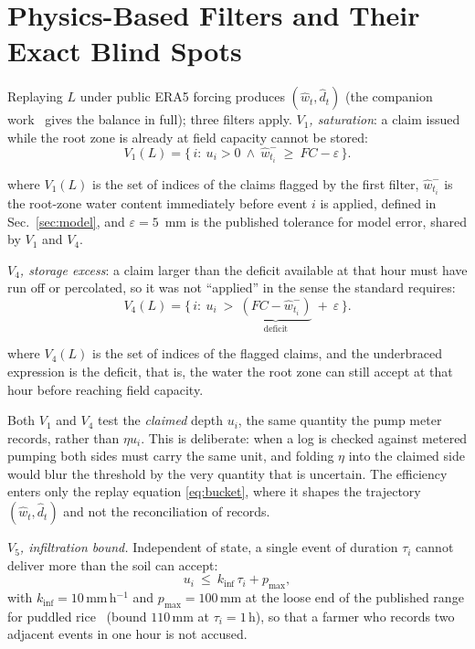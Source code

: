 \section{Physics-Based Filters and Their Exact Blind Spots}
\label{sec:filters}

Replaying $L$ under public ERA5 forcing produces $(\hat w_t,\hat d_t)$ (the
companion work~\cite{twingate2026} gives the balance in full); three filters
apply. \emph{$V_1$, saturation}: a claim issued while the root zone is already
at field capacity cannot be stored:
\begin{equation}
V_1(L)=\{\,i:\ u_i>0\ \wedge\ \hat w_{t_i}^{-}\ \ge\ FC-\varepsilon\,\}.
\label{eq:v1}
\end{equation}

where $V_1(L)$ is the set of indices of the claims flagged by the first filter,
$\hat w_{t_i}^{-}$ is the root-zone water content immediately before event $i$ is
applied, defined in Sec.~\ref{sec:model}, and $\varepsilon=5$~mm is the published
tolerance for model error, shared by $V_1$ and $V_4$.

\emph{$V_4$, storage excess}: a claim larger than the deficit available at
that hour must have run off or percolated, so it was not ``applied'' in the
sense the standard requires:
\begin{equation}
V_4(L)=\{\,i:\ u_i\ >\ \underbrace{(FC-\hat w_{t_i}^{-})}_{\text{deficit}}
\ +\ \varepsilon\,\}.
\label{eq:v4}
\end{equation}

where $V_4(L)$ is the set of indices of the flagged claims, and the underbraced
expression is the deficit, that is, the water the root zone can still accept at that
hour before reaching field capacity.

Both $V_1$ and $V_4$ test the \emph{claimed} depth $u_i$, the same quantity the pump
meter records, rather than $\eta u_i$. This is deliberate: when a log is checked
against metered pumping both sides must carry the same unit, and folding $\eta$ into
the claimed side would blur the threshold by the very quantity that is uncertain.
The efficiency enters only the replay equation \eqref{eq:bucket}, where it shapes
the trajectory $(\hat w_t,\hat d_t)$ and not the reconciliation of records.

\emph{$V_5$, infiltration bound.} Independent of state, a single event of
duration $\tau_i$ cannot deliver more than the soil can accept:
\begin{equation}
u_i\ \le\ k_{\mathrm{inf}}\,\tau_i+p_{\max},
\label{eq:v5}
\end{equation}
with $k_{\mathrm{inf}}=10$\,mm\,h$^{-1}$ and $p_{\max}=100$\,mm at the
loose end of the published range for puddled rice~\cite{kukal2004,bouman2001}
(bound $110$\,mm at $\tau_i=1$\,h), so that a farmer who records two adjacent
events in one hour is not accused.


